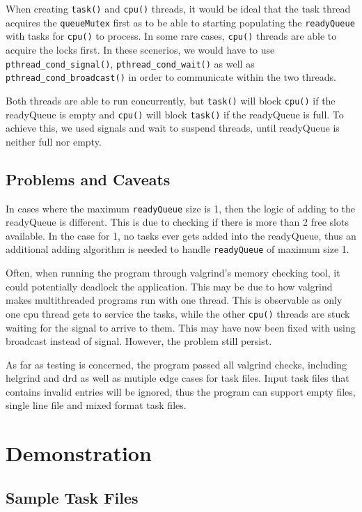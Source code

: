 \documentclass[a4paper, 12pt, titlepage]{article}
\newcommand{\code}[1]{\small\texttt{#1}\normalsize}
\begin{document}
When creating \code{task()} and \code{cpu()} threads, it would be ideal that
the task thread acquires the \code{queueMutex} first as to be able to starting
populating the \code{readyQueue} with tasks for \code{cpu()} to process. In
some rare cases, \code{cpu()} threads are able to acquire the locks first. In
these scenerios, we would have to use
\code{pthread\string_cond\string_signal()},
\code{pthread\string_cond\string_wait()} as well as
\code{pthread\string_cond\string_broadcast()} in order to communicate within
the two threads.

Both threads are able to run concurrently, but \code{task()} will block
\code{cpu()} if the readyQueue is empty and \code{cpu()} will block
\code{task()} if the readyQueue is full. To achieve this, we used signals and
wait to suspend threads, until readyQueue is neither full nor empty.

\subsection{Problems and Caveats}
In cases where the maximum \code{readyQueue} size is 1, then the logic of
adding to the readyQueue is different. This is due to checking if there is more
than 2 free slots available. In the case for 1, no tasks ever gets added into
the readyQueue, thus an additional adding algorithm is needed to handle
\code{readyQueue} of maximum size 1.

Often, when running the program through valgrind's memory checking tool, it
could potentially deadlock the application. This may be due to how valgrind
makes multithreaded programs run with one thread. This is observable as only
one cpu thread gets to service the tasks, while the other \code{cpu()} threads
are stuck waiting for the signal to arrive to them. This may have now been
fixed with using broadcast instead of signal. However, the problem still
persist.

As far as testing is concerned, the program passed all valgrind checks,
including helgrind and drd as well as mutiple edge cases for task files. Input
task files that contains invalid entries will be ignored, thus the program can
support empty files, single line file and mixed format task files.

\newpage
\section{Demonstration}
\subsection{Sample Task Files}
\end{document}
